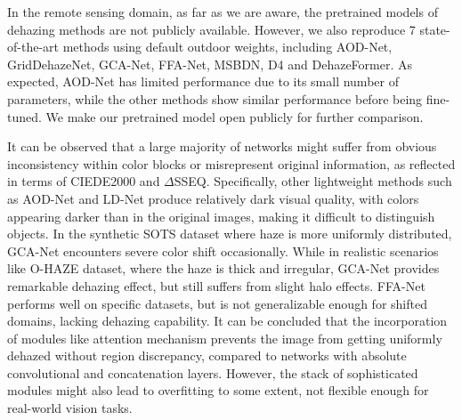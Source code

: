 \documentclass[lettersize,journal]{IEEEtran}
\begin{document}
In the remote sensing domain, as far as we are aware, the pretrained models of dehazing methods are not publicly available. However, we also reproduce 7 state-of-the-art methods using default outdoor weights, including AOD-Net\cite{li2017aod}, GridDehazeNet\cite{liu2019griddehazenet}, GCA-Net\cite{chen2019gated}, FFA-Net\cite{qin2020ffa}, MSBDN\cite{msbdn2020}, D4\cite{yang2022d4} and DehazeFormer\cite{dehazeformer}. As expected, AOD-Net has limited performance due to its small number of parameters, while the other methods show similar performance before being fine-tuned. We make our pretrained model open publicly for further comparison.

It can be observed that a large majority of networks might suffer from obvious inconsistency within color blocks or misrepresent original information, as reflected in terms of CIEDE2000 and $\Delta$SSEQ. Specifically, other lightweight methods such as AOD-Net \cite{li2017aod} and LD-Net \cite{ullah2021light} produce relatively dark visual quality, with colors appearing darker than in the original images, making it difficult to distinguish objects. In the synthetic SOTS dataset where haze is more uniformly distributed, GCA-Net\cite{chen2019gated} encounters severe color shift occasionally. While in realistic scenarios like O-HAZE dataset, where the haze is thick and irregular, GCA-Net\cite{chen2019gated} provides remarkable dehazing effect, but still suffers from slight halo effects. FFA-Net\cite{qin2020ffa} performs well on specific datasets, but is not generalizable enough for shifted domains, lacking dehazing capability. It can be concluded that the incorporation of modules like attention mechanism prevents the image from getting uniformly dehazed without region discrepancy, compared to networks with absolute convolutional and concatenation layers. However, the stack of sophisticated modules might also lead to overfitting to some extent, not flexible enough for real-world vision tasks.   
\end{document}

